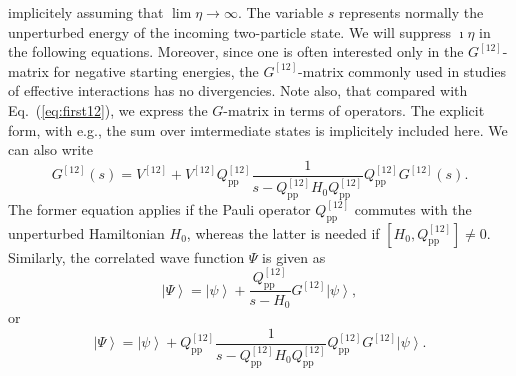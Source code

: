 \documentclass[twoside,12pt]{article}
\newcommand{\ket}[1]{\left| #1 \right\rangle}
\begin{document}
implicitely assuming that $\lim \eta \rightarrow \infty$.
The variable $s$ represents normally the unperturbed
energy of the incoming two-particle state. We will suppress $\imath \eta$ in the
following equations. Moreover, since one is often interested only in the
$G^{[12]}$-matrix
for negative starting energies, the $G^{[12]}$-matrix commonly used in studies
of effective interactions has no divergencies. Note also, that compared with 
Eq.~(\ref{eq:first12}), we express the $G$-matrix in terms of operators. The explicit form,
with e.g., the sum over imtermediate states is implicitely included here.
We can also write
\begin{equation}
      G^{[12]}(s )=V^{[12]}+V^{[12]}Q^{[12]}_{\mathrm{pp}}
      \frac{1}{s -Q^{[12]}_{\mathrm{pp}}H_0Q^{[12]}_{\mathrm{pp}}}
      Q^{[12]}_{\mathrm{pp}}
      G^{[12]}(s ).
      \label{eq:g2}
\end{equation}
The former equation applies if the Pauli operator $Q^{[12]}_{\mathrm{pp}}$  commutes
with the unperturbed Hamiltonian $H_0$, whereas the latter is
needed if $[H_0,Q^{[12]}_{\mathrm{pp}}]\neq 0$.
Similarly, the correlated wave function $\Psi$
is given as
\begin{equation}
    \ket{\Psi}=\ket{\psi}+
    \frac{Q^{[12]}_{\mathrm{pp}}}{s - H_0}G^{[12]}\ket{\psi},
    \label{eq:wave}
\end{equation}
or
\begin{equation}
   \ket{\Psi}=\ket{\psi}+Q^{[12]}_{\mathrm{pp}}\frac{1}
    {s - Q^{[12]}_{\mathrm{pp}}H_0Q^{[12]}_{\mathrm{pp}}}
    Q^{[12]}_{\mathrm{pp}}G^{[12]}\ket{\psi}.
\end{equation}
\end{document}
